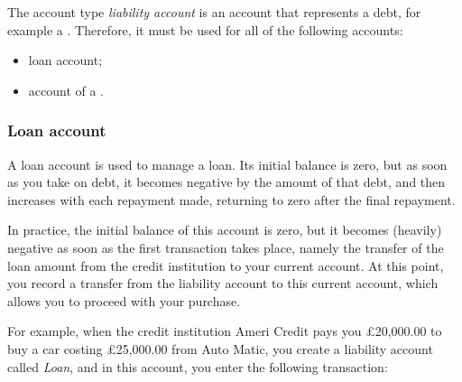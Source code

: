 The account type \emph{liability account} is an account that represents a debt, for example a . Therefore, it must be used for all of the following accounts:
\begin{itemize}
	\item loan account;
	\item account of a .
\end{itemize}


\subsubsection{Loan account\label{accounts-type-liabilities-loan}}

A loan account is used to manage a loan. Its initial balance is zero, but as soon as you take on debt, it becomes negative by the amount of that debt, and then increases with each repayment made, returning to zero after the final repayment. 

In practice, the initial balance of this account is zero, but it becomes (heavily) negative as soon as the first transaction takes place, namely the transfer of the loan amount from the credit institution to your current account. At this point, you record a transfer from the liability account to this current account, which allows you to proceed with your purchase.

For example, when the credit institution Ameri Credit pays you £20,000.00 to buy a car costing £25,000.00 from Auto Matic, you create a liability account called \emph{Loan}, and in this account, you enter the following transaction:

